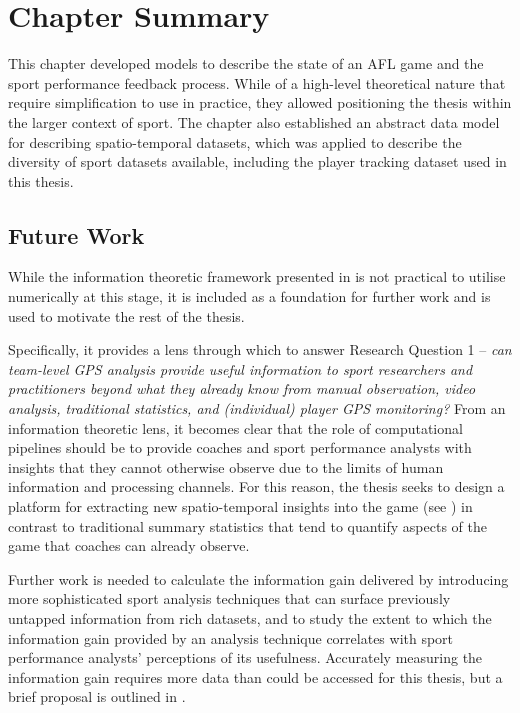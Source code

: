 \section{Chapter Summary}

This chapter developed models to describe the state of an AFL game and the sport performance feedback process. While of a high-level theoretical nature that require simplification to use in practice, they allowed positioning the thesis within the larger context of sport. The chapter also established an abstract data model for describing spatio-temporal datasets, which was applied to describe the diversity of sport datasets available, including the player tracking dataset used in this thesis.

\subsection*{Future Work}

While the information theoretic framework presented in  is not practical to utilise numerically at this stage, it is included as a foundation for further work and is used to motivate the rest of the thesis.

Specifically, it provides a lens through which to answer Research Question 1 -- \textit{can team-level GPS analysis provide useful information to sport researchers and practitioners beyond what they already know from manual observation, video analysis, traditional statistics, and (individual) player GPS monitoring?} From an information theoretic lens, it becomes clear that the role of computational pipelines should be to provide coaches and sport performance analysts with insights that they cannot otherwise observe due to the limits of human information and processing channels. For this reason, the thesis seeks to design a platform for extracting new spatio-temporal insights into the game (see ) in contrast to traditional summary statistics that tend to quantify aspects of the game that coaches can already observe.

Further work is needed to calculate the information gain delivered by introducing more sophisticated sport analysis techniques that can surface previously untapped information from rich datasets, and to study the extent to which the information gain provided by an analysis technique correlates with sport performance analysts' perceptions of its usefulness. Accurately measuring the information gain requires more data than could be accessed for this thesis, but a brief proposal is outlined in .


